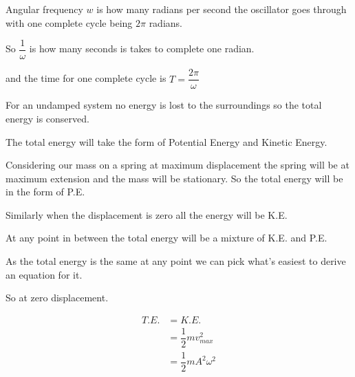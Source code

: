 \documentclass[revision-guide.tex]{subfiles}
\begin{document}

Angular frequency $w$ is how many radians per second the oscillator goes through with one complete cycle being $2 \pi$ radians.

So $\dfrac{1}{\omega}$ is how many seconds is takes to complete one radian.

and the time for one complete cycle is $T = \dfrac{2 \pi}{\omega}$



For an undamped system no energy is lost to the surroundings so the total energy is conserved.

The total energy will take the form of Potential Energy  and Kinetic Energy.

Considering our mass on a spring at maximum displacement the spring will be at maximum extension and the mass will be stationary. So the total energy will be in the form of P.E.

Similarly when the displacement is zero all the energy will be K.E.

At any point in between the total energy will be a mixture of K.E. and P.E. 

As the total energy is the same at any point we can pick what's easiest to derive an equation for it.

So at zero displacement.




\begin{align*} 
T.E. &= K.E. \\
&= \dfrac{1}{2}mv_{max}^2 \\
&= \dfrac{1}{2}mA^2\omega^2 \\
\end{align*}

\end{document}
